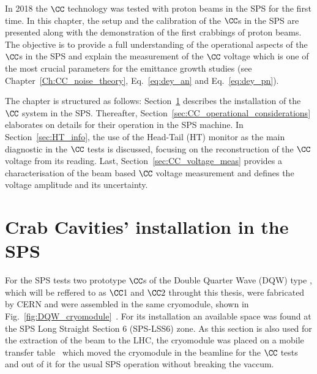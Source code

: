 \vspace*{-1mm}

In 2018 the $\CC$ technology was tested with proton beams in the SPS for the first time. In this chapter, the setup and the calibration of the $\CC$s in the SPS are presented along with the demonstration of the first crabbings of proton beams. The objective is to provide a full understanding of the operational aspects of the $\CC$s in the SPS and explain the measurement of the $\CC$ voltage which is one of the most crucial parameters for the emittance growth studies (see Chapter~\ref{Ch:CC_noise_theory}, Eq.~\eqref{eq:dey_an} and Eq.~\eqref{eq:dey_pn}). 

The chapter is structured as follows: Section~\ref{sec:cc_sps_installation} describes the installation of the $\CC$ system in the SPS. Thereafter, Section~\ref{sec:CC_operational_considerations} elaborates on details for their operation in the SPS machine. In Section~\ref{sec:HT_info}, the use of the Head-Tail (HT) monitor as the main diagnostic in the $\CC$ tests is discussed, focusing on the reconstruction of the $\CC$ voltage from its reading. Last, Section~\ref{sec:CC_voltage_meas} provides a characterisation of the beam based $\CC$ voltage measurement and defines the voltage amplitude and its uncertainty.


\section{Crab Cavities' installation in the SPS}\label{sec:cc_sps_installation}
For the SPS tests two prototype $\CC$s of the Double Quarter Wave (DQW) type
, which will be reffered to as $\CC$1 and $\CC2$ throught this thesis, were fabricated by CERN and were assembled in the same cryomodule, shown in Fig.~\ref{fig:DQW_cryomodule}~\cite{Zanoni:2017}. For its installation an available space was found at the SPS Long Straight Section 6 (SPS-LSS6) zone. As this section is also used for the extraction of the beam to the LHC, the cryomodule was placed on a mobile transfer table~\cite{Calaga:2649807} which  moved the cryomodule in the beamline for the $\CC$ tests and out of it for the usual SPS operation without breaking the vaccum.

